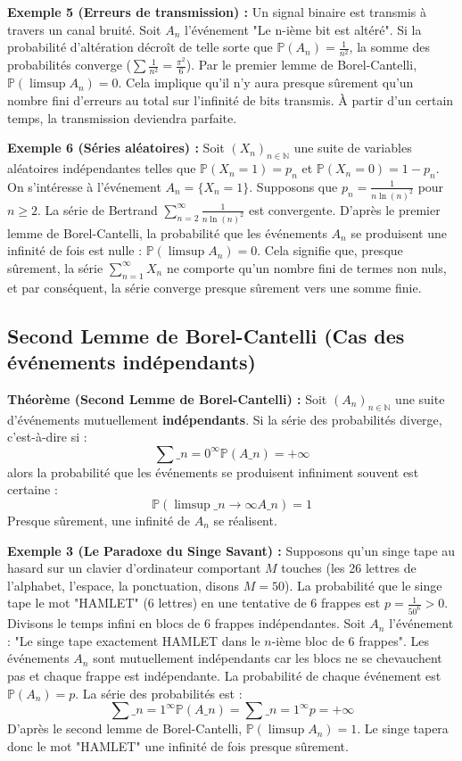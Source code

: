 \documentclass[11pt,a4paper]{article}
\begin{document}
\textbf{Exemple 5 (Erreurs de transmission) :}
Un signal binaire est transmis à travers un canal bruité. Soit $A_n$ l'événement "Le n-ième bit est altéré".
Si la probabilité d'altération décroît de telle sorte que $\mathbb{P}(A_n) = \frac{1}{n^2}$,
la somme des probabilités converge ($\sum \frac{1}{n^2} = \frac{\pi^2}{6}$).
Par le premier lemme de Borel-Cantelli, $\mathbb{P}(\limsup A_n) = 0$.
Cela implique qu'il n'y aura presque sûrement qu'un nombre fini d'erreurs au total sur l'infinité de bits transmis. À partir d'un certain temps, la transmission deviendra parfaite.





\textbf{Exemple 6 (Séries aléatoires) :}
Soit $(X_n)_{n \in \mathbb{N}}$ une suite de variables aléatoires indépendantes telles que $\mathbb{P}(X_n = 1) = p_n$ et $\mathbb{P}(X_n = 0) = 1 - p_n$.
On s'intéresse à l'événement $A_n = \{X_n = 1\}$.
Supposons que $p_n = \frac{1}{n \ln(n)^2}$ pour $n \ge 2$. La série de Bertrand $\sum_{n=2}^\infty \frac{1}{n \ln(n)^2}$ est convergente.
D'après le premier lemme de Borel-Cantelli, la probabilité que les événements $A_n$ se produisent une infinité de fois est nulle : $\mathbb{P}(\limsup A_n) = 0$.
Cela signifie que, presque sûrement, la série $\sum_{n=1}^\infty X_n$ ne comporte qu'un nombre fini de termes non nuls, et par conséquent, la série converge presque sûrement vers une somme finie.

\subsection{Second Lemme de Borel-Cantelli (Cas des événements indépendants)}

\textbf{Théorème (Second Lemme de Borel-Cantelli) :}
Soit $(A_n)_{n \in \mathbb{N}}$ une suite d'événements mutuellement \textbf{indépendants}. Si la série des probabilités diverge, c'est-à-dire si :
$$ \sum\_{n=0}^\infty \mathbb{P}(A\_n) = +\infty $$
alors la probabilité que les événements se produisent infiniment souvent est certaine :
$$ \mathbb{P}\left(\limsup\_{n \to \infty} A\_n\right) = 1 $$
Presque sûrement, une infinité de $A_n$ se réalisent.

\textbf{Exemple 3 (Le Paradoxe du Singe Savant) :}
Supposons qu'un singe tape au hasard sur un clavier d'ordinateur comportant $M$ touches (les 26 lettres de l'alphabet, l'espace, la ponctuation, disons $M = 50$). La probabilité que le singe tape le mot "HAMLET" (6 lettres) en une tentative de 6 frappes est $p = \frac{1}{50^6} > 0$.
Divisons le temps infini en blocs de 6 frappes indépendantes.
Soit $A_n$ l'événement : "Le singe tape exactement HAMLET dans le $n$-ième bloc de 6 frappes".
Les événements $A_n$ sont mutuellement indépendants car les blocs ne se chevauchent pas et chaque frappe est indépendante.
La probabilité de chaque événement est $\mathbb{P}(A_n) = p$.
La série des probabilités est :
$$ \sum\_{n=1}^\infty \mathbb{P}(A\_n) = \sum\_{n=1}^\infty p = +\infty $$
D'après le second lemme de Borel-Cantelli, $\mathbb{P}(\limsup A_n) = 1$. Le singe tapera donc le mot "HAMLET" une infinité de fois presque sûrement.
\end{document}
